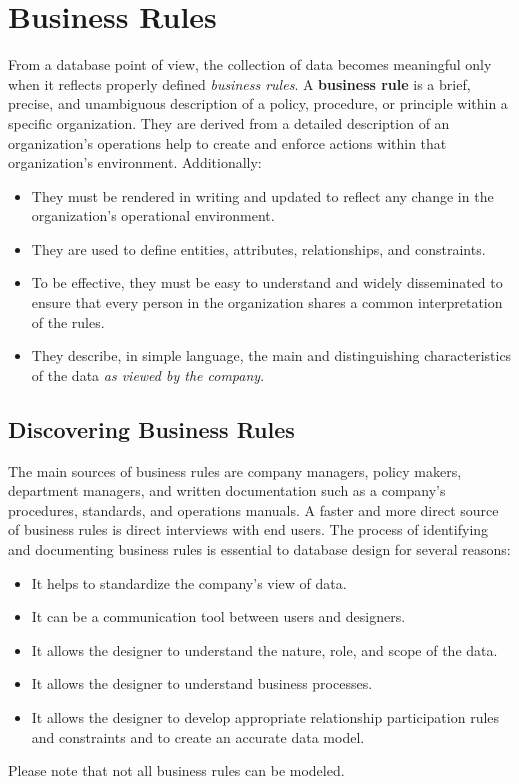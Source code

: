 \documentclass[a4paper, 12pt, titlepage]{report}
\begin{document}
\section{Business Rules}
From a database point of view, the collection of data becomes meaningful only when it reflects properly defined \emph{business rules}. A \textbf{business rule} is a brief, precise, and unambiguous description of a policy, procedure, or principle within a specific organization. They are derived from a detailed description of an organization’s operations help to create and enforce actions within that organization’s environment. Additionally:
\begin{itemize}
\item They must be rendered in writing and updated to reflect any change in the organization’s operational environment.
\item They are used to define entities, attributes, relationships, and constraints. 
\item To be effective, they must be easy to understand and widely disseminated to ensure that every person in the organization shares a common interpretation of the rules.
\item They describe, in simple language, the main and distinguishing characteristics of the data \emph{as viewed by the company}.
\end{itemize}
\subsection{Discovering Business Rules}
The main sources of business rules are company managers, policy makers, department managers, and written documentation such as a company’s procedures, standards, and operations manuals. A faster and more direct source of business rules is direct interviews with end users.
The process of identifying and documenting business rules is essential to database design for several reasons:
\begin{itemize}
\item It helps to standardize the company’s view of data.
\item It can be a communication tool between users and designers.
\item It allows the designer to understand the nature, role, and scope of the data.
\item It allows the designer to understand business processes.
\item It allows the designer to develop appropriate relationship participation rules and constraints and to create an accurate data model.
\end{itemize}
Please note that not all business rules can be modeled.
\end{document}
